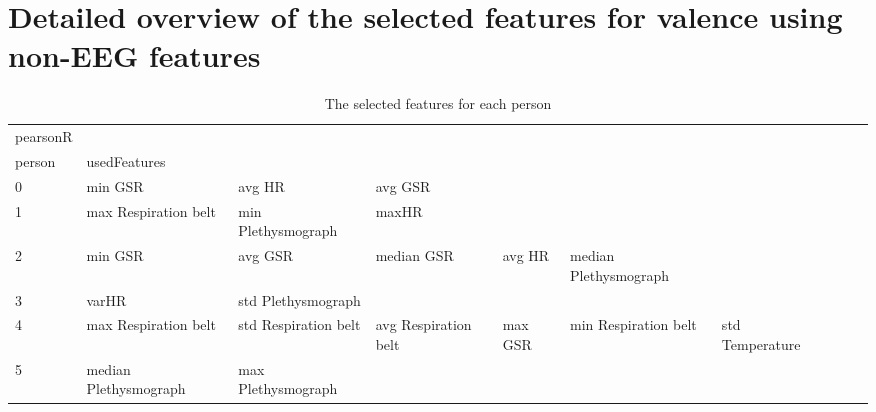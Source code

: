 \chapter{Detailed overview of the selected features for valence using non-EEG features}

\begin{landscape}
\begin{table}[]
\centering
\caption{The selected features for each person}
\begin{tabular}{l|llllllll}
pearsonR &                         &                         &                         &                         &                         &                       &                         &                         &                         &         \\
person   & usedFeatures            &                         &                         &                         &                         &                       &                         &                         &                         &         \\
0        & min GSR                 & avg HR                  & avg GSR                 &                         &                         &                       &                         &                         &                         &         \\
1        & max Respiration belt    & min Plethysmograph      & maxHR                   &                         &                         &                       &                         &                         &                         &         \\
2        & min GSR                 & avg GSR                 & median GSR              & avg HR                  & median Plethysmograph   &                       &                         &                         &                         &         \\
3        & varHR                   & std Plethysmograph      &                         &                         &                         &                       &                         &                         &                         &         \\
4        & max Respiration belt    & std Respiration belt    & avg Respiration belt    & max GSR                 & min Respiration belt    & std Temperature       &                         &                         &                         &         \\
5        & median Plethysmograph   & max Plethysmograph      &                         &                         &                         &                       &                         &                         &                         &         \\

\end{tabular}
\end{table}
\end{landscape}
